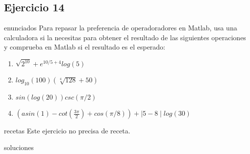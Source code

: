 \subsection{Ejercicio 14}
\def\parte{enunciados}
\ifx\capitulo\parte
Para repasar la preferencia de operadoradores en Matlab, usa una calculadora si la necesitas para obtener el resultado de las siguientes operaciones y comprueba en Matlab si el resultado es el esperado:

\begin{enumerate}
\item $\sqrt{2^{10}} + e^{10/5+4}log(5)$
\item $log_{10}(100)(\sqrt[4]{128} + 50)$
\item $sin(log(20))csc(\pi/2)$
\item $(asin(1) - cot(\frac{3\pi}{2}) + cos(\pi/8)) + \mid 5 - 8 \mid log(30)$
\end{enumerate}

\fi

\def\parte{recetas}
\ifx\capitulo\parte
Este ejercicio no precisa de receta.
\fi

\def\parte{soluciones}
\ifx\capitulo\parte

\fi
